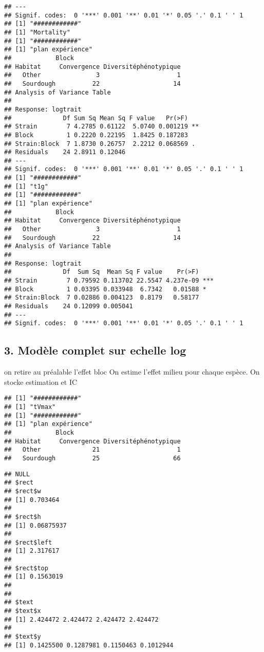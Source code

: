 \documentclass[
]{article}
\begin{document}
\begin{verbatim}
## ---
## Signif. codes:  0 '***' 0.001 '**' 0.01 '*' 0.05 '.' 0.1 ' ' 1
## [1] "############"
## [1] "Mortality"
## [1] "############"
## [1] "plan expérience"
##            Block
## Habitat     Convergence Diversitéphénotypique
##   Other               3                     1
##   Sourdough          22                    14
## Analysis of Variance Table
## 
## Response: logtrait
##              Df Sum Sq Mean Sq F value   Pr(>F)   
## Strain        7 4.2785 0.61122  5.0740 0.001219 **
## Block         1 0.2220 0.22195  1.8425 0.187283   
## Strain:Block  7 1.8730 0.26757  2.2212 0.068569 . 
## Residuals    24 2.8911 0.12046                    
## ---
## Signif. codes:  0 '***' 0.001 '**' 0.01 '*' 0.05 '.' 0.1 ' ' 1
## [1] "############"
## [1] "t1g"
## [1] "############"
## [1] "plan expérience"
##            Block
## Habitat     Convergence Diversitéphénotypique
##   Other               3                     1
##   Sourdough          22                    14
## Analysis of Variance Table
## 
## Response: logtrait
##              Df  Sum Sq  Mean Sq F value    Pr(>F)    
## Strain        7 0.79592 0.113702 22.5547 4.237e-09 ***
## Block         1 0.03395 0.033948  6.7342   0.01588 *  
## Strain:Block  7 0.02886 0.004123  0.8179   0.58177    
## Residuals    24 0.12099 0.005041                      
## ---
## Signif. codes:  0 '***' 0.001 '**' 0.01 '*' 0.05 '.' 0.1 ' ' 1
\end{verbatim}

\hypertarget{moduxe8le-complet-sur-echelle-log}{%
\subsection{3. Modèle complet sur echelle
log}\label{moduxe8le-complet-sur-echelle-log}}

on retire au préalable l'effet bloc On estime l'effet milieu pour chaque
espèce. On stocke estimation et IC

\begin{verbatim}
## [1] "############"
## [1] "tVmax"
## [1] "############"
## [1] "plan expérience"
##            Block
## Habitat     Convergence Diversitéphénotypique
##   Other              21                     1
##   Sourdough          25                    66
\end{verbatim}

\begin{verbatim}
## NULL
## $rect
## $rect$w
## [1] 0.703464
## 
## $rect$h
## [1] 0.06875937
## 
## $rect$left
## [1] 2.317617
## 
## $rect$top
## [1] 0.1563019
## 
## 
## $text
## $text$x
## [1] 2.424472 2.424472 2.424472 2.424472
## 
## $text$y
## [1] 0.1425500 0.1287981 0.1150463 0.1012944
\end{verbatim}
\end{document}
